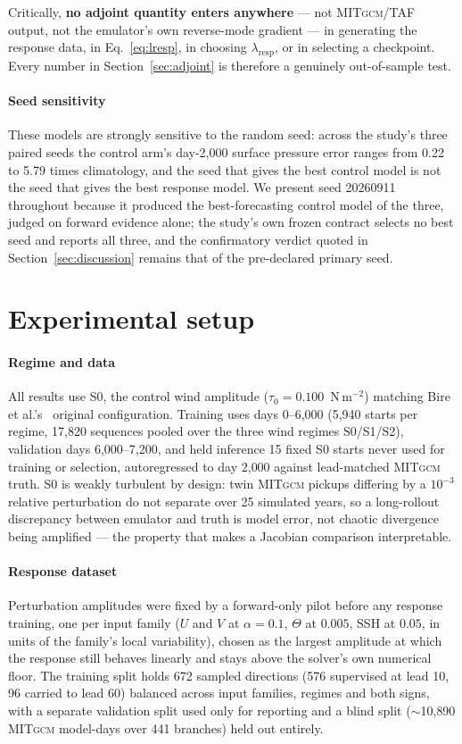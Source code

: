 \documentclass[3p,12pt]{elsarticle}
\newcommand{\MITgcm}{\textsc{MITgcm}}
\begin{document}
Critically, \textbf{no adjoint quantity enters anywhere} --- not \MITgcm{}/TAF
output, not the emulator's own reverse-mode gradient --- in generating the
response data, in Eq.~\eqref{eq:lresp}, in choosing $\lambda_{\mathrm{resp}}$,
or in selecting a checkpoint. Every number in Section~\ref{sec:adjoint} is
therefore a genuinely out-of-sample test.

\paragraph{Seed sensitivity} These models are strongly sensitive to the random
seed: across the study's three paired seeds the control arm's day-2{,}000 surface
pressure error ranges from 0.22 to 5.79 times climatology, and the seed that
gives the best control model is not the seed that gives the best response model.
We present seed 20260911 throughout because it produced the best-forecasting
control model of the three, judged on forward evidence alone; the study's own
frozen contract selects no best seed and reports all three, and the confirmatory
verdict quoted in Section~\ref{sec:discussion} remains that of the pre-declared
primary seed.

\section{Experimental setup}
\label{sec:setup}

\paragraph{Regime and data} All results use S0, the control wind amplitude
($\tau_0=0.100$~N\,m$^{-2}$) matching Bire et al.'s~\cite{Bire2025} original
configuration. Training uses days 0--6{,}000 (5{,}940 starts per regime, 17{,}820
sequences pooled over the three wind regimes S0/S1/S2), validation days
6{,}000--7{,}200, and held inference 15 fixed S0 starts never used for training
or selection, autoregressed to day 2{,}000 against lead-matched \MITgcm{} truth.
S0 is weakly turbulent by design: twin \MITgcm{} pickups differing by a $10^{-3}$
relative perturbation do not separate over 25 simulated years, so a long-rollout
discrepancy between emulator and truth is model error, not chaotic divergence
being amplified --- the property that makes a Jacobian comparison interpretable.

\paragraph{Response dataset} Perturbation amplitudes were fixed by a
forward-only pilot before any response training, one per input family
($U$ and $V$ at $\alpha=0.1$, $\Theta$ at $0.005$, SSH at $0.05$, in units of
the family's local variability), chosen as the largest amplitude at which the
response still behaves linearly and stays above the solver's own numerical
floor. The training split holds 672 sampled directions (576 supervised at lead
10, 96 carried to lead 60) balanced across input families, regimes and both
signs, with a separate validation split used only for reporting and a blind
split ($\sim$10{,}890 \MITgcm{} model-days over 441 branches) held out entirely.
\end{document}
